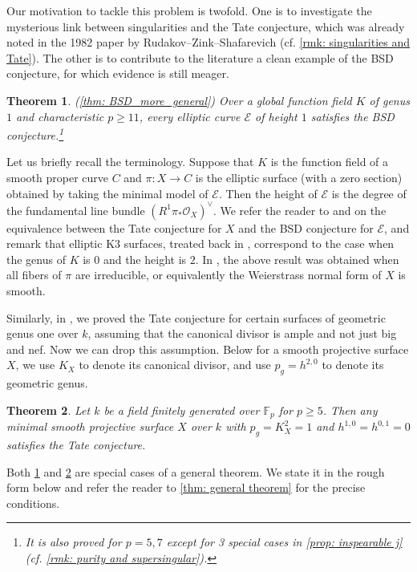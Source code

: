 \documentclass[11pt, letterpaper]{amsart}
\theoremstyle{plain}
\newtheorem{theorem}{Theorem}[section]
\theoremstyle{definition}
\newcommand{\IF}{\mathbb{F}}
\newcommand{\<}{\langle}
\renewcommand{\>}{\rangle}
\newcommand{\sE}{\mathcal{E}}
\newcommand{\sO}{\mathcal{O}}
\begin{document}
Our motivation to tackle this problem is twofold. One is to investigate the mysterious link between singularities and the Tate conjecture, which was already noted in the 1982 paper by Rudakov--Zink--Shafarevich \cite{RZS} (cf. \cref{rmk: singularities and Tate}). The other is to contribute to the literature a clean example of the BSD conjecture, for which evidence is still meager.

\begin{theorem}
\emph{(\cref{thm: BSD_more_general})}
\label{thm: BSD}
    Over a global function field $K$ of genus $1$ and characteristic $p \ge 11$, every elliptic curve $\sE$ of height $1$ satisfies the BSD conjecture.\footnote{It is also proved for $p = 5, 7$ except for 3 special cases in \cref{prop: inspearable j} (cf. \cref{rmk: purity and supersingular}).}
\end{theorem}

Let us briefly recall the terminology. 
Suppose that $K$ is the function field of a smooth proper curve $C$ and $\pi : X \to C$ is the elliptic surface (with a zero section) obtained by taking the minimal model of $\sE$. 
Then the height of $\sE$ is the degree of the fundamental line bundle $(R^1 \pi_* \sO_X)^\vee$. 
We refer the reader to \cite{Mil75} and \cite{KT03} on the equivalence between the Tate conjecture for $X$ and the BSD conjecture for $\sE$, and remark that elliptic K3 surfaces, treated back in \cite{ASD}, correspond to the case when the genus of $K$ is $0$ and the height is $2$. 
In \cite[Thm.\ A]{HYZ}, the above result was obtained when all fibers of $\pi$ are irreducible, or equivalently the Weierstrass normal form of $X$ is smooth.

Similarly, in \cite[Thm.\ C]{HYZ}, we proved the Tate conjecture for certain surfaces of geometric genus one over $k$, assuming that the canonical divisor is ample and not just big and nef. Now we can drop this assumption. 
Below for a smooth projective surface $X$, we use $K_X$ to denote its canonical divisor, and use $p_g = h^{2,0}$ to denote its geometric genus.
\begin{theorem}
\label{thm: general type}
    Let $k$ be a field finitely generated over $\IF_p$ for $p \ge 5$. Then any minimal smooth projective surface $X$ over $k$ with $p_g = K_X^2 = 1$ and $h^{1,0} = h^{0, 1} = 0$ satisfies the Tate conjecture.
\end{theorem}


Both \cref{thm: BSD} and \cref{thm: general type} are special cases of a general theorem.
We state it in the rough form below and refer the reader to \cref{thm: general theorem} for the precise conditions. 
\end{document}
